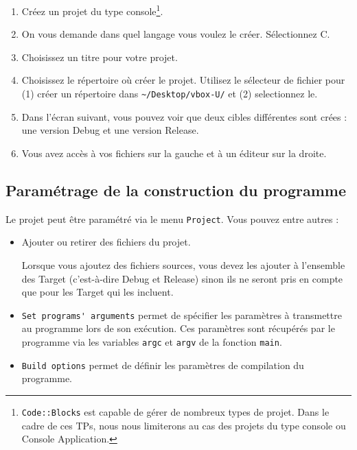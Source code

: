 \begin{enumerate}
  \item Créez un projet du type console\footnote{\texttt{Code::Blocks} est capable de gérer de nombreux types de projet. Dans le cadre de ces TPs, nous nous limiterons au cas des projets du type console ou \og{}Console Application\fg{}.}.
  \item On vous demande dans quel langage vous voulez le créer. Sélectionnez \og{}C\fg{}.
  \item Choisissez un titre pour votre projet.
  \item Choisissez le répertoire où créer le projet. Utilisez le sélecteur de fichier pour (1) créer un répertoire dans \verb'~/Desktop/vbox-U/' et (2) selectionnez le.
  \begin{center}
  \hspace{0.5cm}
  \end{center}
  \item Dans l'écran suivant, vous pouvez voir que deux cibles différentes sont crées : une version Debug et une version Release.
  \item Vous avez accès à vos fichiers sur la gauche et à un éditeur sur la droite.
\end{enumerate}

\subsection{Paramétrage de la construction du programme}

Le projet peut être paramétré via le menu \verb-Project-. Vous pouvez entre autres :
\begin{itemize}
  \item Ajouter ou retirer des fichiers du projet. 
\begin{commonerrors}
Lorsque vous ajoutez des fichiers sources, vous devez les ajouter à l'ensemble des \og{}Target\fg{} (c'est-à-dire Debug et Release) sinon ils ne seront pris en compte que pour les \og{}Target\fg{} qui les incluent.
\end{commonerrors}
  \item \verb-Set programs' arguments- permet de spécifier les paramètres à transmettre au programme lors de son exécution. Ces paramètres sont récupérés par le programme via les variables \verb-argc- et \verb-argv- de la fonction \verb-main-.
  \item \verb-Build options- permet de définir les paramètres de compilation du programme.
\end{itemize}

